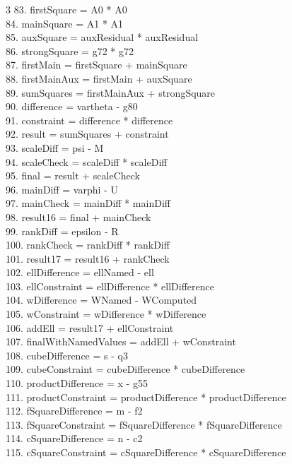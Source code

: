 \documentclass[10pt]{article}
\begin{document}
\begin{multicols}{3}
83. firstSquare = A0 * A0\\
84. mainSquare = A1 * A1\\
85. auxSquare = auxResidual * auxResidual\\
86. strongSquare = g72 * g72\\
87. firstMain = firstSquare + mainSquare\\
88. firstMainAux = firstMain + auxSquare\\
89. sumSquares = firstMainAux + strongSquare\\
90. difference = vartheta - g80\\
91. constraint = difference * difference\\
92. result = sumSquares + constraint\\
93. scaleDiff = psi - M\\
94. scaleCheck = scaleDiff * scaleDiff\\
95. final = result + scaleCheck\\
96. mainDiff = varphi - U\\
97. mainCheck = mainDiff * mainDiff\\
98. result16 = final + mainCheck\\
99. rankDiff = epsilon - R\\
100. rankCheck = rankDiff * rankDiff\\
101. result17 = result16 + rankCheck\\
102. ellDifference = ellNamed - ell\\
103. ellConstraint = ellDifference * ellDifference\\
104. wDifference = WNamed - WComputed\\
105. wConstraint = wDifference * wDifference\\
106. addEll = result17 + ellConstraint\\
107. finalWithNamedValues = addEll + wConstraint\\
108. cubeDifference = s - q3\\
109. cubeConstraint = cubeDifference * cubeDifference\\
110. productDifference = x - g55\\
111. productConstraint = productDifference * productDifference\\
112. fSquareDifference = m - f2\\
113. fSquareConstraint = fSquareDifference * fSquareDifference\\
114. cSquareDifference = n - c2\\
115. cSquareConstraint = cSquareDifference * cSquareDifference\\

\end{multicols}
\end{document}

